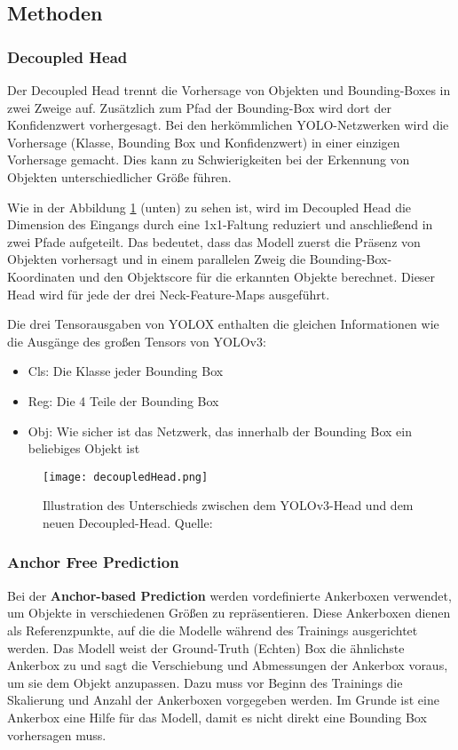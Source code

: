 \subsection{Methoden}
\subsubsection{Decoupled Head}\label{chap:decoupledHead}
Der Decoupled Head trennt die Vorhersage von Objekten und Bounding-Boxes in zwei Zweige auf. Zusätzlich zum Pfad der Bounding-Box wird dort der Konfidenzwert vorhergesagt. Bei den herkömmlichen YOLO-Netzwerken wird die Vorhersage (Klasse, Bounding Box und Konfidenzwert) in einer einzigen Vorhersage gemacht. Dies kann zu Schwierigkeiten bei der Erkennung von Objekten unterschiedlicher Größe führen. 

Wie in der Abbildung \ref{fig:decoupledHead} (unten) zu sehen ist, wird im Decoupled Head die Dimension des Eingangs durch eine 1x1-Faltung reduziert und anschließend in zwei Pfade aufgeteilt. Das bedeutet, dass das Modell zuerst die Präsenz von Objekten vorhersagt und in einem parallelen Zweig die Bounding-Box-Koordinaten und den Objektscore für die erkannten Objekte berechnet. Dieser Head wird für jede der drei Neck-Feature-Maps ausgeführt. \cite{yoloxExplanationHowWorks}

Die drei Tensorausgaben von YOLOX enthalten die gleichen Informationen wie die Ausgänge des großen Tensors von YOLOv3:
\begin{itemize}
\item Cls: Die Klasse jeder Bounding Box
\item Reg: Die 4 Teile der Bounding Box
\item Obj: Wie sicher ist das Netzwerk, das innerhalb der Bounding Box ein beliebiges Objekt ist
\end{itemize}


\begin{figure}[h]
	\centering
	\texttt{[image: decoupledHead.png]}
	\caption[Illustration des Unterschieds zwischen dem Yolov3-Head und dem neuen Decoupled-Head ]{Illustration des Unterschieds zwischen dem YOLOv3-Head und dem neuen Decoupled-Head. Quelle: \cite{yoloxPaper}}
	\label{fig:decoupledHead}
\end{figure}




\subsubsection{Anchor Free Prediction}\label{chap:anchorFree}
Bei der \textbf{Anchor-based Prediction} werden vordefinierte Ankerboxen verwendet, um Objekte in verschiedenen Größen zu repräsentieren. Diese Ankerboxen dienen als Referenzpunkte, auf die die Modelle während des Trainings ausgerichtet werden. Das Modell weist der Ground-Truth (Echten) Box die ähnlichste Ankerbox zu und sagt die Verschiebung und Abmessungen der Ankerbox voraus, um sie dem Objekt anzupassen. Dazu muss vor Beginn des Trainings die Skalierung und Anzahl der Ankerboxen vorgegeben werden. Im Grunde ist eine Ankerbox eine Hilfe für das Modell, damit es nicht direkt eine Bounding Box vorhersagen muss.


